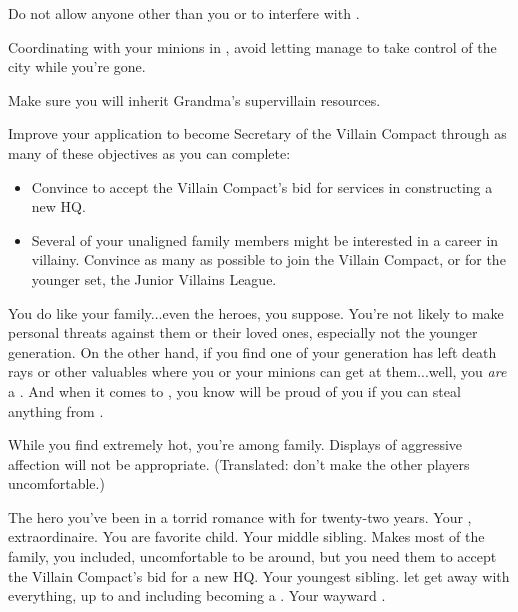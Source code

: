 \documentclass[char]{LRSguildcamp1}
\begin{document}
\begin{itemz}[Goals]
	\item Do not allow anyone other than you or \cOS{} to interfere with \pCityO{}.
	\item Coordinating with your minions in \pCityO{}, avoid letting \cOS{} manage to take control of the city while you're gone.
	\item Make sure you will inherit Grandma's supervillain resources. %
	\item Improve your application to become Secretary of the Villain Compact through as many of these objectives as you can complete:
	\begin{itemize}
		\item Convince \cArchitect{} to accept the Villain Compact's bid for \cArchitect{\their} services in constructing a new HQ.
		\item Several of your unaligned family members might be interested in a career in villainy.  Convince as many as possible to join the Villain Compact, or for the younger set, the Junior Villains League.
	\end{itemize}
\end{itemz}

\begin{itemz}[Notes]
	\item You do like your family...even the heroes, you suppose.  You're not likely to make personal threats against them or their loved ones, especially not the younger generation.  On the other hand, if you find one of your generation has left death rays or other valuables where you or your minions can get at them...well, you \emph{are} a \cOldest{\villain}.  And when it comes to \cGrandma{\Parent}, you know \cGrandma{\they} will be proud of you if you can steal anything from \cGrandma{\them}. 
	\item While you find \cOS{} extremely hot, you're among family.  Displays of aggressive affection will not be appropriate.  (Translated: don't make the other players uncomfortable.)
\end{itemz}

\begin{contacts}
	\contact{\cOS{}} The hero you've been in a torrid romance with for twenty-two years.
	\contact{\cGrandma{}} Your \cGrandma{\parent}, \cGrandma{\villain} extraordinaire.  You are \cGrandma{\their} favorite child.
	\contact{\cArchitect{}} Your middle sibling.  Makes most of the family, you included, uncomfortable to be around, but you need them to accept the Villain Compact's bid for a new HQ.
	\contact{\cYoungest{}} Your youngest sibling.  \cGrandma{\Parent} let \cYoungest{\them} get away with everything, up to and including becoming a \cYoungest{\hero}.
	\contact{\cGrad{}} Your wayward \cGrad{\offspring}.
\end{contacts}
\end{document}
